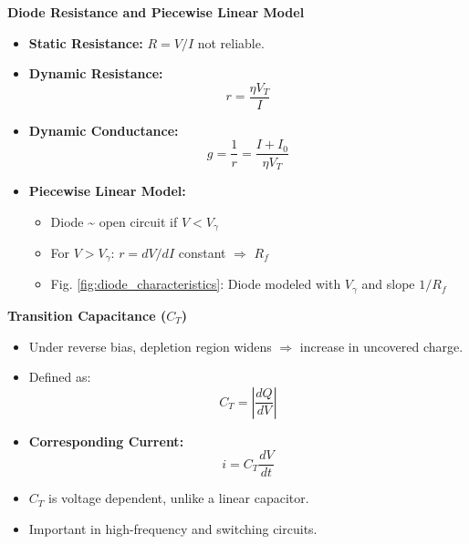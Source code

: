 \begin{frame}{\textbf{Diode Resistance and Piecewise Linear Model}}
    \begin{itemize}
        \item \textbf{Static Resistance:} $R = V/I$ \textemdash{} not reliable.
        \item \textbf{Dynamic Resistance:}
        \begin{equation*}
            r = \frac{\eta V_T}{I}
        \end{equation*}
        \item \textbf{Dynamic Conductance:}
        \begin{equation*}
            g = \frac{1}{r} = \frac{I + I_0}{\eta V_T}
        \end{equation*}
        \item \textbf{Piecewise Linear Model:}
        \begin{itemize}
            \item Diode \textasciitilde{} open circuit if $V < V_\gamma$
            \item For $V > V_\gamma$: $r = dV/dI$ constant $\Rightarrow$ $R_f$
            \item Fig. \ref{fig:diode_characteristics}: Diode modeled with $V_\gamma$ and slope $1/R_f$
        \end{itemize}
    \end{itemize}
\end{frame}

\begin{frame}{\textbf{Transition Capacitance ($C_T$)}}
    \begin{itemize}
        \item Under reverse bias, depletion region widens $\Rightarrow$ increase in uncovered charge.
        \item Defined as:
        \begin{equation*}
            C_T = \left| \frac{dQ}{dV} \right|
        \end{equation*}
        \item \textbf{Corresponding Current:}
        \begin{equation*}
            i = C_T \frac{dV}{dt}
        \end{equation*}
        \item $C_T$ is voltage dependent, unlike a linear capacitor.
        \item Important in high-frequency and switching circuits.
    \end{itemize}
\end{frame}


